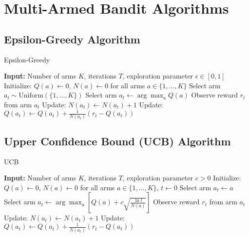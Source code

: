 \documentclass{article}
\begin{document}
\section{Multi-Armed Bandit Algorithms}

\subsection{Epsilon-Greedy Algorithm}
\begin{algorithm}
\caption{Epsilon-Greedy}
\begin{algorithmic}
\State \textbf{Input:} Number of arms $K$, iterations $T$, exploration parameter $\epsilon \in [0, 1]$
\State Initialize: $Q(a) \gets 0$, $N(a) \gets 0$ for all arms $a \in \{1, \dots, K\}$
        \State Select arm $a_t \sim \text{Uniform}(\{1, \dots, K\})$
    \Else
        \State Select arm $a_t \gets \arg\max_{a} Q(a)$ 
    \EndIf
    \State Observe reward $r_t$ from arm $a_t$
    \State Update: $N(a_t) \gets N(a_t) + 1$
    \State Update: $Q(a_t) \gets Q(a_t) + \frac{1}{N(a_t)} (r_t - Q(a_t))$
\EndFor
\end{algorithmic}
\end{algorithm}

\subsection{Upper Confidence Bound (UCB) Algorithm}
\begin{algorithm}
\caption{UCB}
\begin{algorithmic}
\State \textbf{Input:} Number of arms $K$, iterations $T$, exploration parameter $c > 0$
\State Initialize: $Q(a) \gets 0$, $N(a) \gets 0$ for all arms $a \in \{1, \dots, K\}$, $t \gets 0$
        \State Select arm $a_t \gets a$
    \Else
        \State Select arm $a_t \gets \arg\max_{a} \left[ Q(a) + c \sqrt{\frac{\ln t}{N(a)}} \right]$
    \EndIf
    \State Observe reward $r_t$ from arm $a_t$
    \State Update: $N(a_t) \gets N(a_t) + 1$
    \State Update: $Q(a_t) \gets Q(a_t) + \frac{1}{N(a_t)} (r_t - Q(a_t))$
\EndFor
\end{algorithmic}
\end{algorithm}
\end{document}
